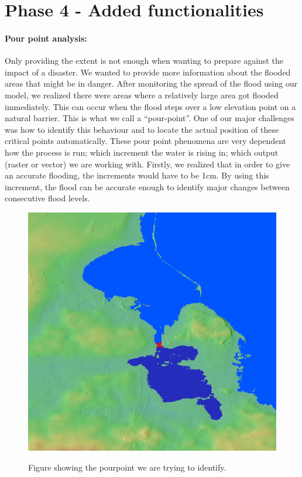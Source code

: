 \section{Phase 4 - Added functionalities}
\label{ch:phase4}

\paragraph{Pour point analysis:} Only providing the extent is not enough when wanting to prepare against the impact of a disaster. We wanted to provide more information about the flooded areas that might be in danger. After monitoring the spread of the flood using our model, we realized there were areas where a relatively large area got flooded immediately. This can occur when the flood steps over a low elevation point on a natural barrier. This is what we call a “pour-point”. One of our major challenges was how to identify this behaviour and to locate the actual position of these critical points automatically.
These pour point phenomena are very dependent how the process is run; which increment the water is rising in; which output (raster or vector) we are working with. Firstly, we realized that in order to give an accurate flooding, the increments would have to be 1cm. By using this increment, the flood can be accurate enough to identify major changes between consecutive flood levels.

\begin{figure}[h!]
\centering
	{\includegraphics[width=0.80\linewidth]{gfx/Pourpoint.png}}
\caption{Figure showing the pourpoint we are trying to identify.}
\label{fig:pourpoint}
\end{figure}

